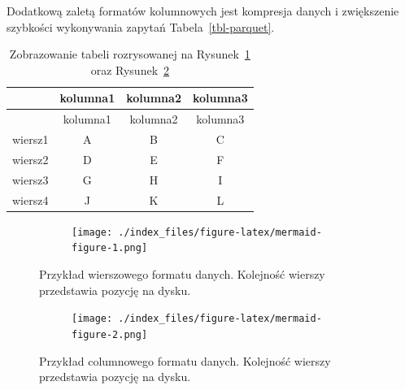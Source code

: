 \documentclass[
  letterpaper,
  DIV=11,
  numbers=noendperiod]{scrreprt}
\begin{document}
Dodatkową zaletą formatów kolumnowych jest kompresja danych i
zwiększenie szybkości wykonywania zapytań Tabela~\ref{tbl-parquet}.

\hypertarget{tbl-logical}{}
\begin{longtable}[]{@{}cccc@{}}
\caption{\label{tbl-logical}Zobrazowanie tabeli rozrysowanej na
Rysunek~\ref{fig-row} oraz Rysunek~\ref{fig-col}}\tabularnewline
\toprule()
& kolumna1 & kolumna2 & kolumna3 \\
\midrule()
\endfirsthead
\toprule()
& kolumna1 & kolumna2 & kolumna3 \\
\midrule()
\endhead
wiersz1 & A & B & C \\
wiersz2 & D & E & F \\
wiersz3 & G & H & I \\
wiersz4 & J & K & L \\
\bottomrule()
\end{longtable}

\begin{figure}

{\centering 

\begin{figure}[H]

{\centering \texttt{[image: ./index\_files/figure-latex/mermaid-figure-1.png]}

}

\end{figure}

}

\caption{\label{fig-row}Przykład wierszowego formatu danych. Kolejność
wierszy przedstawia pozycję na dysku.}

\end{figure}

\begin{figure}

{\centering 

\begin{figure}[H]

{\centering \texttt{[image: ./index\_files/figure-latex/mermaid-figure-2.png]}

}

\end{figure}

}

\caption{\label{fig-col}Przykład columnowego formatu danych. Kolejność
wierszy przedstawia pozycję na dysku.}

\end{figure}
\end{document}
